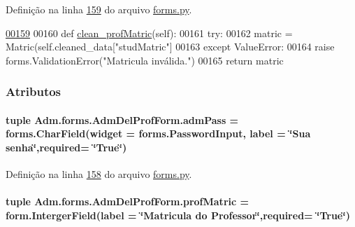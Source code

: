 Definição na linha \hyperlink{Adm_2forms_8py_source_l00159}{159} do arquivo \hyperlink{Adm_2forms_8py_source}{forms.\-py}.


\begin{DoxyCode}
\hypertarget{classAdm_1_1forms_1_1AdmDelProfForm_l00159}{}\hyperlink{classAdm_1_1forms_1_1AdmDelProfForm_aad92572be5ea398d700b331c79cc608e}{00159} 
00160     \textcolor{keyword}{def }\hyperlink{classAdm_1_1forms_1_1AdmDelProfForm_aad92572be5ea398d700b331c79cc608e}{clean\_profMatric}(self):
00161         \textcolor{keywordflow}{try}:
00162             matric = Matric(self.cleaned\_data[\textcolor{stringliteral}{"studMatric"}]
00163         \textcolor{keywordflow}{except} ValueError:
00164             \textcolor{keywordflow}{raise} forms.ValidationError(\textcolor{stringliteral}{"Matricula inválida."})
00165         \textcolor{keywordflow}{return} matric
    
\end{DoxyCode}


\subsubsection{Atributos}
\hypertarget{classAdm_1_1forms_1_1AdmDelProfForm_a5c75c479d2d63fb207af1fd9eb1d85ad}{
\paragraph[{adm\-Pass}]{\setlength{\rightskip}{0pt plus 5cm}tuple Adm.\-forms.\-Adm\-Del\-Prof\-Form.\-adm\-Pass = forms.\-Char\-Field(widget = forms.\-Password\-Input, label = \char`\"{}Sua senha\char`\"{},required= \char`\"{}True\char`\"{})\hspace{0.3cm}{\ttfamily [static]}}}\label{classAdm_1_1forms_1_1AdmDelProfForm_a5c75c479d2d63fb207af1fd9eb1d85ad}


Definição na linha \hyperlink{Adm_2forms_8py_source_l00158}{158} do arquivo \hyperlink{Adm_2forms_8py_source}{forms.\-py}.

\hypertarget{classAdm_1_1forms_1_1AdmDelProfForm_a3b53155ed7b63a0ad994c47305061ca1}{
\paragraph[{prof\-Matric}]{\setlength{\rightskip}{0pt plus 5cm}tuple Adm.\-forms.\-Adm\-Del\-Prof\-Form.\-prof\-Matric = form.\-Interger\-Field(label = \char`\"{}Matricula do Professor\char`\"{},required= \char`\"{}True\char`\"{})\hspace{0.3cm}{\ttfamily [static]}}}\label{classAdm_1_1forms_1_1AdmDelProfForm_a3b53155ed7b63a0ad994c47305061ca1}


